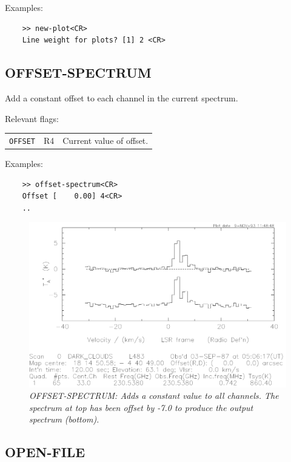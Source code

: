 \documentclass[11pt,twoside]{report}
\begin{document}
Examples:
\begin{verbatim}
    >> new-plot<CR>
    Line weight for plots? [1] 2 <CR>
\end{verbatim}

\subsection{OFFSET-SPECTRUM} 

Add a constant offset to each channel in the current spectrum.

Relevant flags:\\
\begin{tabular}{lll}
  \verb+OFFSET+ & R4 & Current value of offset.
\end{tabular}

Examples:
\begin{verbatim}
    >> offset-spectrum<CR>
    Offset [    0.00] 4<CR>
    ..
\end{verbatim}

\begin{figure}[htbp]
\begin{center}
\includegraphics[scale=0.65]{offset}
\protect\parbox{5.5in}
{\caption[OFFSET]
{\sl
OFFSET-SPECTRUM: Adds a constant value to all channels. The spectrum at top
has been offset by -7.0 to produce the output spectrum (bottom).
\label{OFFSET}
}
}
\end{center}
\end{figure}

\subsection{OPEN-FILE} 
\end{document}
